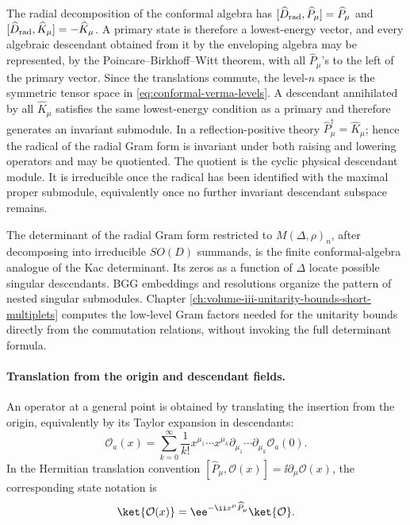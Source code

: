 The radial decomposition of the conformal algebra has
\([\widehat D_{\rm rad},\widehat P_\mu]=\widehat P_\mu\) and
\([\widehat D_{\rm rad},\widehat K_\mu]=-\widehat K_\mu\).  A primary state is
therefore a lowest-energy vector, and every algebraic descendant obtained from
it by the enveloping algebra may be represented, by the
Poincare--Birkhoff--Witt theorem, with all \(\widehat P_\mu\)'s to the left
of the primary vector.  Since the translations commute, the level-\(n\)
space is the symmetric tensor space in
\eqref{eq:conformal-verma-levels}.  A descendant annihilated by all
\(\widehat K_\mu\) satisfies the same lowest-energy condition as a primary and
therefore generates an invariant submodule.  In a reflection-positive theory
\(\widehat P_\mu^\dagger=\widehat K_\mu\); hence the radical of the radial
Gram form is invariant under both raising and lowering operators and may be
quotiented.  The quotient is the cyclic physical descendant module.  It is
irreducible once the radical has been identified with the maximal proper
submodule, equivalently once no further invariant descendant subspace remains.

The determinant of the radial Gram form restricted to \(M(\Delta,\rho)_n\),
after decomposing into irreducible \(SO(D)\) summands, is the finite
conformal-algebra analogue of the Kac determinant.  Its zeros as a function
of \(\Delta\) locate possible singular descendants.  BGG embeddings and
resolutions organize the pattern of nested singular submodules.  Chapter
\ref{ch:volume-iii-unitarity-bounds-short-multiplets} computes the low-level
Gram factors needed for the unitarity bounds directly from the commutation
relations, without invoking the full determinant formula.

\paragraph{Translation from the origin and descendant fields.}
An operator at a general point is obtained by translating the insertion from
the origin, equivalently by its Taylor expansion in descendants:
\begin{equation}
  \mathcal O_a(x)
  =
  \sum_{k=0}^\infty
  \frac1{k!}
  x^{\mu_1}\cdots x^{\mu_k}
  \partial_{\mu_1}\cdots\partial_{\mu_k}\mathcal O_a(0).
  \label{eq:operator-from-origin-translation}
\end{equation}
In the Hermitian translation convention
\([\widehat P_\mu,\mathcal O(x)]=\ii\partial_\mu\mathcal O(x)\), the
corresponding state notation is
\[
  \ket{\mathcal O(x)}
  =
  \ee^{-\ii x^\mu\widehat P_\mu}\ket{\mathcal O}.
\]


